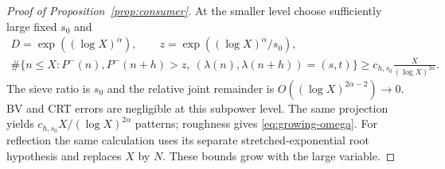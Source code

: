 \documentclass[11pt]{article}
\theoremstyle{definition}
\theoremstyle{remark}
\numberwithin{equation}{section}
\begin{document}
\begin{proof}[Proof of Proposition~\ref{prop:consumer}]
At the smaller level choose sufficiently large fixed $s_0$ and
\begin{equation}\label{eq:a-subpower-choices}
\begin{gathered}
 D=\exp((\log X)^\alpha),\qquad z=\exp((\log X)^\alpha/s_0),\\
 \#\{n\le X:P^-(n),P^-(n+h)>z,\ (\lambda(n),\lambda(n+h))=(s,t)\}
 \ge c_{h,s_0}\frac X{(\log X)^{2\alpha}}.
\end{gathered}
\end{equation} The sieve ratio is $s_0$ and the relative joint remainder is
$O((\log X)^{2\alpha-2})\to0$. BV and CRT errors are negligible at this subpower level.
The same projection yields $c_{h,s_0}X/(\log X)^{2\alpha}$ patterns; roughness gives
\eqref{eq:growing-omega}. For reflection the same calculation uses its separate stretched-exponential
root hypothesis and replaces $X$ by $N$. These bounds grow with the large variable.
\end{proof}
\end{document}
